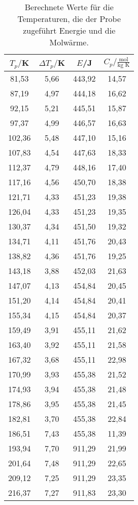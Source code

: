\begin{table}[htp]
  \label{tab:ref}
	\begin{center}
    \caption{Berechnete Werte für die Temperaturen, die der Probe zugeführt Energie und die
    Molwärme.}
		\begin{tabular}{cccc}
		\toprule
			{$T_p/$K} & {$\Delta T_p/$K} & {$E$/J} & {$C_p/\frac{\text{mol}}{\text{kg K}}$}\\
			\midrule
			81,53 & 5,66 & 443,92 & 14,57\\
			87,19 & 4,97 & 444,18 & 16,62\\
			92,15 & 5,21 & 445,51 & 15,87\\
			97,37 & 4,99 & 446,57 & 16,63\\
			102,36 & 5,48 & 447,10 & 15,16\\
			107,83 & 4,54 & 447,63 & 18,33\\
			112,37 & 4,79 & 448,16 & 17,40\\
			117,16 & 4,56 & 450,70 & 18,38\\
			121,71 & 4,33 & 451,23 & 19,38\\
			126,04 & 4,33 & 451,23 & 19,35\\
			130,37 & 4,34 & 451,50 & 19,32\\
			134,71 & 4,11 & 451,76 & 20,43\\
			138,82 & 4,36 & 451,76 & 19,25\\
			143,18 & 3,88 & 452,03 & 21,63\\
			147,07 & 4,13 & 454,84 & 20,45\\
			151,20 & 4,14 & 454,84 & 20,41\\
			155,34 & 4,15 & 454,84 & 20,37\\
			159,49 & 3,91 & 455,11 & 21,62\\
			163,40 & 3,92 & 455,11 & 21,58\\
			167,32 & 3,68 & 455,11 & 22,98\\
			170,99 & 3,93 & 455,38 & 21,52\\
			174,93 & 3,94 & 455,38 & 21,48\\
			178,86 & 3,95 & 455,38 & 21,45\\
			182,81 & 3,70 & 455,38 & 22,84\\
			186,51 & 7,43 & 455,38 & 11,39\\
			193,94 & 7,70 & 911,29 & 21,99\\
			201,64 & 7,48 & 911,29 & 22,65\\
			209,12 & 7,25 & 911,29 & 23,35\\
			216,37 & 7,27 & 911,83 & 23,30\\

\end{tabular}
\end{center}
\end{table}
